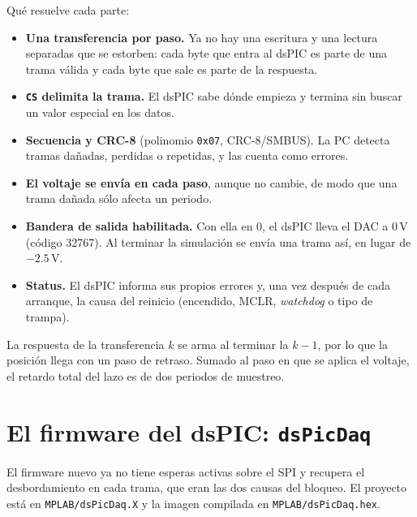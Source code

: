 \documentclass[11pt]{article}
\newcommand{\code}[1]{\texttt{#1}}
\begin{document}
Qué resuelve cada parte:

\begin{itemize}
\item \textbf{Una transferencia por paso.} Ya no hay una escritura y una
  lectura separadas que se estorben: cada byte que entra al dsPIC es parte de
  una trama válida y cada byte que sale es parte de la respuesta.
\item \textbf{\code{CS} delimita la trama.} El dsPIC sabe dónde empieza y
  termina sin buscar un valor especial en los datos.
\item \textbf{Secuencia y CRC-8} (polinomio \code{0x07}, CRC-8/SMBUS). La PC
  detecta tramas dañadas, perdidas o repetidas, y las cuenta como errores.
\item \textbf{El voltaje se envía en cada paso}, aunque no cambie, de modo que
  una trama dañada sólo afecta un periodo.
\item \textbf{Bandera de salida habilitada.} Con ella en 0, el dsPIC lleva el
  DAC a 0\,V (código 32767). Al terminar la simulación se envía una trama así,
  en lugar de $-2.5$\,V.
\item \textbf{Status.} El dsPIC informa sus propios errores y, una vez después
  de cada arranque, la causa del reinicio (encendido, MCLR, \emph{watchdog} o
  tipo de trampa).
\end{itemize}

La respuesta de la transferencia $k$ se arma al terminar la $k-1$, por lo que
la posición llega con un paso de retraso. Sumado al paso en que se aplica el
voltaje, el retardo total del lazo es de dos periodos de muestreo.

\section{El firmware del dsPIC: \code{dsPicDaq}}
\label{sec:firmware}

El firmware nuevo ya no tiene esperas activas sobre el SPI y recupera el
desbordamiento en cada trama, que eran las dos causas del bloqueo. El proyecto
está en \code{MPLAB/dsPicDaq.X} y la imagen compilada en
\code{MPLAB/dsPicDaq.hex}.
\end{document}
